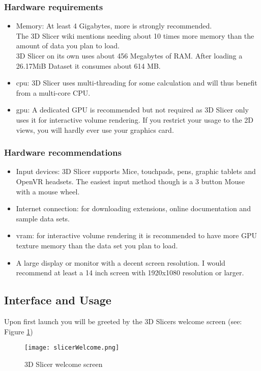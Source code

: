 \subsubsection{Hardware requirements}
\begin{itemize}
	\item Memory: At least 4 Gigabytes, more is strongly recommended.\\ The 3D Slicer wiki mentions needing about 10 times more memory than the amount of data you plan to load.\\ 3D Slicer on its own uses about 456 Megabytes of RAM. After loading a 26.17MiB Dataset it consumes about 614 MB.
	\item \gls{cpu}: 3D Slicer uses multi-threading for some calculation and will thus benefit from a multi-core CPU.
	\item \gls{gpu}: A dedicated GPU is recommended but not required as 3D Slicer only uses it for interactive volume rendering. If you restrict your usage to the 2D views, you will hardly ever use your graphics card.
\end{itemize}

\subsubsection{Hardware recommendations}

\begin{itemize}
	\item Input devices: 3D Slicer supports Mice, touchpads, pens, graphic tablets and OpenVR headsets. The easiest input method though is a 3 button Mouse with a mouse wheel.
	\item Internet connection: for downloading extensions, online documentation and sample data sets.
	\item \gls{vram}: for interactive volume rendering it is recommended to have more GPU texture memory than the data set you plan to load.
	\item A large display or monitor with a decent screen resolution. I would recommend at least a 14 inch screen with 1920x1080 resolution or larger.
\end{itemize}


\subsection{Interface and Usage}
Upon first launch you will be greeted by the 3D Slicers welcome screen (see: Figure \ref{fig:slicerWelcome})
\begin{figure}[h!] %
	\centerline{
		\texttt{[image: slicerWelcome.png]}}
	\caption{3D Slicer welcome screen}
	\label{fig:slicerWelcome}
\end{figure}

